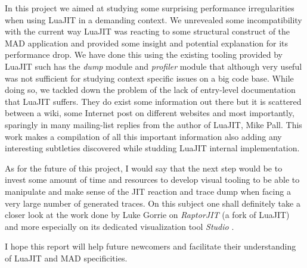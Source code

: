 
In this project we aimed at studying some surprising performance irregularities
when using LuaJIT in a demanding context. We unrevealed some incompatibility
with the current way LuaJIT was reacting to some structural construct of the
MAD application and provided some insight and potential explanation for its
performance drop. We have done this using the existing tooling provided by
LuaJIT such has the \emph{dump} module and \emph{profiler} module that although
very useful was not sufficient for studying context specific issues on a big code
base. While doing so, we tackled down the problem of the lack of entry-level
documentation that LuaJIT suffers. They do exist some information out there but
it is scattered between a wiki, some Internet post on different websites and most
importantly, sparingly in many mailing-list replies from the author of LuaJIT,
Mike Pall. This work makes a compilation of all this important information
also adding any interesting subtleties discovered while studding LuaJIT internal
implementation.

As for the future of this project, I would say that the next step would be to
invest some amount of time and resources to develop visual tooling to be able
to manipulate and make sense of the JIT reaction and trace dump when facing a
very large number of generated traces. On this subject one shall definitely take
a closer look at the work done by Luke Gorrie on \emph{RaptorJIT}
\cite{RaptorJIT} (a fork of LuaJIT) and more especially on its dedicated
visualization tool \emph{Studio} \cite{Studio}.

I hope this report will help future newcomers and facilitate their understanding
of LuaJIT and MAD specificities.
